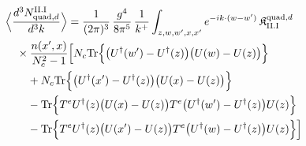 \begin{align}\label{eq:S-II.I-2d}
&\Big\langle\frac{d^{3}N^{\rm II.I}_{{\rm quad},d}}{d^{3}k}\Big\rangle=\frac{1}{(2\pi)^{3}}\, \frac{g^{4}}{8\pi^{5}}\, \frac{1}{k^{+}} \int_{z,w,w',x,x'}e^{-ik\cdot(w-w')}\, \mathfrak{K}^{{\rm quad},d}_{\rm II.I}\notag\\
&\quad \times\frac{n(x',x)}{N_{c}^{2}-1}\Big[N_{c}{\rm Tr}\Big\{\big(U^{\dagger}(w')-U^{\dagger}(z)\big)\big(U(w)-U(z)\big)\Big\}\notag\\
&\quad\quad +N_{c}{\rm Tr}\Big\{\big(U^{\dagger}(x')-U^{\dagger}(z)\big)\big(U(x)-U(z)\big)\Big\}\notag\\
&\quad\quad -{\rm Tr}\Big\{T^{e}U^{\dagger}(z)\big(U(x)-U(z)\big)T^{e}\big(U^{\dagger}(w')-U^{\dagger}(z)\big)U(z)\Big\}\notag\\
&\quad\quad -{\rm Tr}\Big\{T^{e}U^{\dagger}(z)\big(U(x')-U(z)\big)T^{e}\big(U^{\dagger}(w)-U^{\dagger}(z)\big)U(z)\Big\}\Big]
\end{align}
